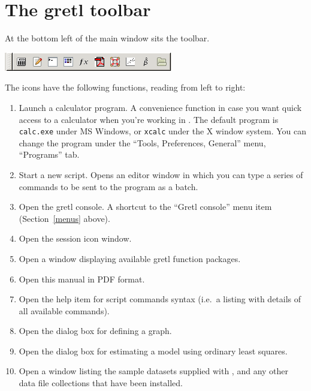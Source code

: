 \section{The gretl toolbar}
\label{toolbar}

At the bottom left of the main window sits the toolbar.

\begin{center}
  \includegraphics[scale=0.75]{figures/toolbar}
\end{center}

The icons have the following functions, reading from left to right:

\begin{enumerate}
\item Launch a calculator program.  A convenience function in case you
  want quick access to a calculator when you're working in
  .  The default program is \verb+calc.exe+ under MS
  Windows, or \verb+xcalc+ under the X window system.  You can change
  the program under the ``Tools, Preferences, General'' menu,
  ``Programs'' tab.
\item Start a new script.  Opens an editor window in which you can
  type a series of commands to be sent to the program as a batch.
\item Open the gretl console.  A shortcut to the ``Gretl console''
  menu item (Section~\ref{menus} above).
\item Open the  session icon window.
\item Open a window displaying available gretl function packages.
\item Open this manual in PDF format.
\item Open the help item for script commands syntax (i.e.\ a listing
  with details of all available commands).
\item Open the dialog box for defining a graph.
\item Open the dialog box for estimating a model using ordinary least
  squares.
\item Open a window listing the sample datasets supplied with
  , and any other data file collections that have been
  installed.
\end{enumerate}


